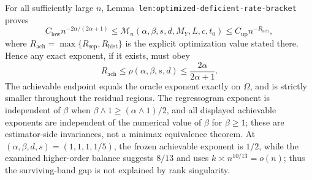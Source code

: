 For all sufficiently large \(n\), Lemma~\texttt{lem:optimized-deficient-rate-bracket} proves
\[
C_{\mathrm{low}}n^{-2\alpha/(2\alpha+1)}
\le
\mathcal M_n(\alpha,\beta,s,d,M_Y,L,c,t_0)
\le
C_{\mathrm{up}}n^{-R_{\mathrm{ach}}},
\]
where \(R_{\mathrm{ach}}=\max\{R_{\mathrm{sep}},R_{\mathrm{hist}}\}\) is the explicit optimization value stated there. Hence any exact exponent, if it exists, must obey
\[
R_{\mathrm{ach}}
\le \rho(\alpha,\beta,s,d)
\le \frac{2\alpha}{2\alpha+1}.
\]
The achievable endpoint equals the oracle exponent exactly on \(\Omega\), and is strictly smaller throughout the residual regions. The regressogram exponent is independent of \(\beta\) when \(\beta\wedge1\ge(\alpha\wedge1)/2\), and all displayed achievable exponents are independent of the numerical value of \(\beta\) for \(\beta\ge1\); these are estimator-side invariances, not a minimax equivalence theorem. At \((\alpha,\beta,d,s)=(1,1,1,1/5)\), the frozen achievable exponent is \(1/2\), while the examined higher-order balance suggests \(8/13\) and uses \(k\asymp n^{10/13}=o(n)\); thus the surviving-band gap is not explained by rank singularity.